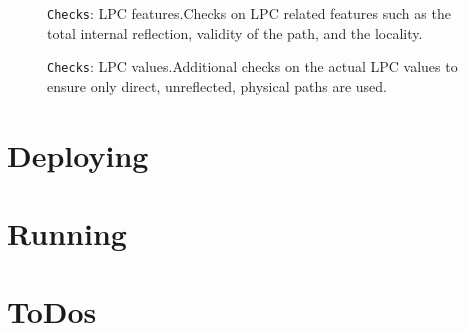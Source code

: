 \documentclass[12pt]{article}
\begin{document}
\begin{figure}
\centering
\noindent{}
  \caption{\centering \texttt{Checks}: LPC features.\hspace{\textwidth}Checks on LPC related features such as the total internal reflection, validity of the path, and the locality.}
  \label{fig:ch4}
\end{figure}

\begin{figure}
\centering
\noindent{}
  \caption{\centering \texttt{Checks}: LPC values.\hspace{\textwidth}Additional checks on the actual LPC values to ensure only direct, unreflected, physical paths are used.}
  \label{fig:ch5}
\end{figure}

\clearpage

\section{Deploying} %

\section{Running}\label{sec:run}

\section{ToDos}
\end{document}
